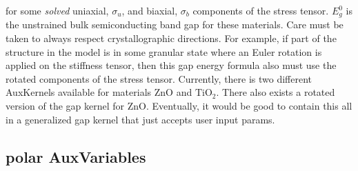 \documentclass[16pt]{article} %
\begin{document}
for some \emph{solved} uniaxial, $\sigma_u$, and biaxial, $\sigma_b$ components of the stress tensor.
%
$E_g^0$ is the unstrained bulk semiconducting band gap for these materials.
%
Care must be taken to always respect crystallographic directions.
%
For example, if part of the structure in the model is in some granular state where an Euler rotation is applied on the stiffness tensor, then this gap energy formula also must use the rotated components of the stress tensor.
%
Currently, there is two different AuxKernels available for materials $\mathrm{ZnO}$ and $\mathrm{TiO}_2$.
%
There also exists a rotated version of the gap kernel for $\mathrm{ZnO}$.
%
Eventually, it would be good to contain this all in a generalized gap kernel that just accepts user input params.
%
%
\subsection{polar AuxVariables}
%
\end{document}
